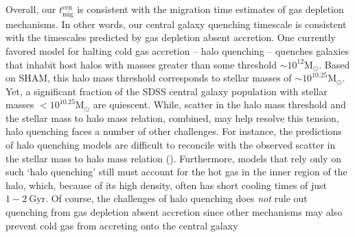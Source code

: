 Overall, our $t_\mathrm{mig}^\mathrm{cen}$ is consistent with the 
migration time estimates of gas depletion mechanisms. In other words, 
our central galaxy quenching timescale is consistent with 
the timescales predicted by gas depletion absent accretion. One currently favored model 
for halting cold gas accretion -- halo quenching -- quenches galaxies 
that inhabit host halos with masses greater than some threshold 
$\sim 10^{12}\mathrm{M}_\odot$. Based on SHAM, this halo mass threshold 
corresponds to stellar masses of $\sim 10^{10.25} \mathrm{M}_\odot$. 
Yet, a significant fraction of the SDSS central galaxy population 
with stellar masses $< 10^{10.25} \mathrm{M}_\odot$ are quiescent.  
While, scatter in the halo mass threshold and the stellar mass to 
halo mass relation, combined, may help resolve this tension, halo quenching 
faces a number of other challenges. For instance, the predictions of
halo quenching models are difficult to reconcile with the observed scatter
in the stellar mass to halo mass relation (\citealt{Tinker:2016aa}).
Furthermore, models that rely only on such ‘halo quenching’ still 
must account for the hot gas in the inner region of the halo, which, 
because of its high density, often has short cooling times of just $1-2~\mathrm{Gyr}$.
Of course, the challenges of halo quenching does {\em not} rule out 
quenching from gas depletion absent accretion since other mechanisms may 
also prevent cold gas from accreting onto the central galaxy 

